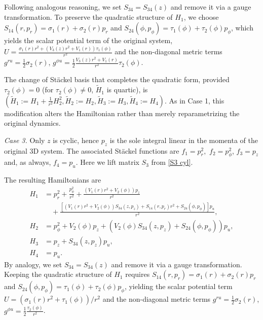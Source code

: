 \documentclass[10pt]{amsart}
\numberwithin{equation}{section}
\theoremstyle{definition}
\begin{document}
Following analogous reasoning, we set $S_{34} = S_{34}(z)$ and remove it via a gauge transformation. To preserve the quadratic structure of $H_1$, we choose $S_{14}(r, p_r) = \sigma_1(r) + \sigma_2(r) p_r$ and $S_{24}(\phi, p_\phi) = \tau_1(\phi) + \tau_2(\phi) p_\phi$, which yields the scalar potential term of the original system, $U = \frac{\sigma_1(r) r^2 + (V_3(z)r^2 + V_1(r))\tau_1(\phi)}{r^2}$ and the non-diagonal metric terms $g^{ru} = \frac{1}{2}\sigma_2(r)$, $g^{\phi u} = \frac{1}{2}\frac{V_3(z)r^2 + V_1(r)}{r^2}\tau_2(\phi)$.%

The change of Stäckel basis that completes the quadratic form,  provided $\tau_2(\phi)=0$ (for $\tau_2(\phi)\neq 0$, $\tilde{H}_1$ is quartic), is $(\tilde{H}_1:=H_1+\frac{1}{r^2}H_2^2,\tilde{H}_2:=H_2,\tilde{H}_3:=H_3,\tilde{H}_4:=H_4).$ As in Case 1, this modification alters the Hamiltonian rather than merely reparametrizing the original dynamics.

\vspace{2mm}

\textit{Case 3.} Only $z$ is cyclic, hence $p_z$ is the sole  integral linear in the momenta of the original 3D system. The associated St\"ackel functions are $f_1=p_r^2,$ $f_2=p_{\phi}^2$, $f_3=p_z$ and, as always, $f_4=p_u$. Here we lift matrix $S_3$ from \eqref{S3 cyl}.

The resulting Hamiltonians are
\begin{equation}
	\begin{split}
		H_1 &= p_r^2 + \frac{p_\phi^2}{r^2} + \frac{(V_1(r) r^2 + V_2(\phi)) p_z}{r^2} \\
		&\quad + \frac{[(V_1(r) r^2+ V_2(\phi)) S_{34}(z, p_z) + S_{14}(r, p_r) r^2 + S_{24}(\phi, p_\phi)] p_u}{r^2}, \\
		H_2 &= p_\phi^2 + V_2(\phi) p_z + (V_2(\phi) S_{34}(z, p_z) + S_{24}(\phi, p_\phi)) p_u, \\
		H_3 &= p_z + S_{34}(z, p_z) p_u, \\
		H_4 &= p_u.
	\end{split}
\end{equation}
By analogy, we set $S_{34} = S_{34}(z)$ and remove it via a gauge transformation. Keeping the quadratic structure of $H_1$ requires $S_{14}(r, p_r) = \sigma_1(r) + \sigma_2(r) p_r$ and $S_{24}(\phi, p_\phi) = \tau_1(\phi) + \tau_2(\phi) p_\phi$, yielding the scalar potential term $U = (\sigma_1(r) r^2 + \tau_1(\phi))/r^2$ and the non-diagonal metric terms $g^{ru} = \frac{1}{2}\sigma_2(r)$, $g^{\phi u} = \frac{1}{2}\frac{\tau_2(\phi)}{r^2}$.
\end{document}
